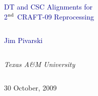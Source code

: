 \documentclass[compress]{beamer}
\begin{document}
\begin{frame}
\vfill
\begin{center}
\textcolor{darkblue}{\Large DT and CSC Alignments for \\ \vspace{0.25 cm} 2$^{\mbox{\scriptsize nd}}$ CRAFT-09 Reprocessing}

\vfill
\begin{columns}
\begin{center}
\large
\textcolor{darkblue}{Jim Pivarski}
\end{center}
\end{columns}

\begin{columns}
\begin{center}
\scriptsize
{\it Texas A\&M University}
\end{center}
\end{columns}

\vfill
30 October, 2009

\end{center}
\end{frame}


\small
\end{document}
